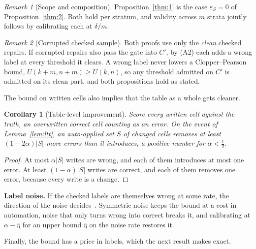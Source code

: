 \documentclass[sigconf, nonacm, balance=false]{acmart}
\newtheorem{corollary}{Corollary}
\theoremstyle{remark}
\newtheorem{remark}{Remark}
\begin{document}
\begin{remark}[Scope and composition]
Proposition~\ref{thm:1} is the case $\varepsilon_S=0$ of
Proposition~\ref{thm:2}. Both hold per stratum, and validity across $m$
strata jointly follows by calibrating each at $\delta/m$.
\end{remark}

\begin{remark}[Corrupted checked sample]
Both proofs use only the \emph{clean} checked repairs. If corrupted repairs also pass
the gate into $C'$, by (A2) each adds a wrong label at every threshold it clears. A
wrong label never lowers a Clopper--Pearson bound, $U(k{+}m,n{+}m)\ge U(k,n)$, so any
threshold admitted on $C'$ is admitted on its clean part, and both propositions hold
as stated.
\end{remark}

The bound on written cells also implies that the table as a whole gets cleaner.

\begin{corollary}[Table-level improvement]
\label{cor:net}
Score every written cell against the truth, an overwritten correct cell counting as an
error. On the event of Lemma~\ref{lem:ltt}, an auto-applied set $S$ of changed cells
removes at least $(1-2\alpha)|S|$ more errors than it introduces, a positive number for
$\alpha<\tfrac12$.
\end{corollary}
\begin{proof}
At most $\alpha|S|$ writes are wrong, and each of them introduces at most one error.
At least $(1-\alpha)|S|$ writes are correct, and each of them removes one error,
because every write is a change.
\end{proof}

\textbf{Label noise.} If the checked labels are themselves wrong at some rate, the
direction of the noise decides~\cite{einbinder2022noisy}. Symmetric noise keeps the
bound at a cost in automation, noise that only turns wrong into correct breaks it, and
calibrating at $\alpha-\bar\eta$ for an upper bound $\bar\eta$ on the noise rate
restores it.


Finally, the bound has a price in labels, which the next result makes exact.
\end{document}
